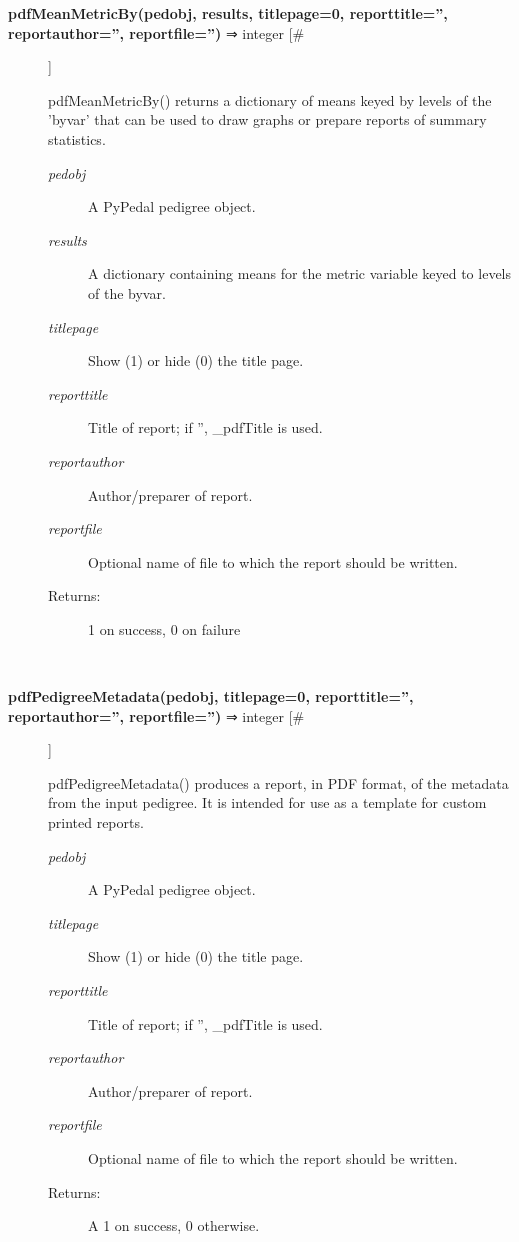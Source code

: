 \documentclass{article}
\begin{document}
\begin{description}
\item[\textbf{pdfMeanMetricBy(pedobj, results, titlepage=0, reporttitle='', reportauthor='', reportfile='')} ⇒ integer [\#]
]
\par pdfMeanMetricBy() returns a dictionary of means keyed by levels of the 'byvar' that
can be used to draw graphs or prepare reports of summary statistics.
\begin{description}
\item[\textit{pedobj}
]
A PyPedal pedigree object.
\item[\textit{results}
]
A dictionary containing means for the metric variable keyed to levels of the byvar.
\item[\textit{titlepage}
]
Show (1) or hide (0) the title page.
\item[\textit{reporttitle}
]
Title of report; if '', \_pdfTitle is used.
\item[\textit{reportauthor}
]
Author/preparer of report.
\item[\textit{reportfile}
]
Optional name of file to which the report should be written.
\item[Returns:
]
1 on success, 0 on failure
\end{description}\\

\item[\textbf{pdfPedigreeMetadata(pedobj, titlepage=0, reporttitle='', reportauthor='', reportfile='')} ⇒ integer [\#]
]
\par pdfPedigreeMetadata() produces a report, in PDF format, of the metadata from
the input pedigree.  It is intended for use as a template for custom printed
reports.
\begin{description}
\item[\textit{pedobj}
]
A PyPedal pedigree object.
\item[\textit{titlepage}
]
Show (1) or hide (0) the title page.
\item[\textit{reporttitle}
]
Title of report; if '', \_pdfTitle is used.
\item[\textit{reportauthor}
]
Author/preparer of report.
\item[\textit{reportfile}
]
Optional name of file to which the report should be written.
\item[Returns:
]
A 1 on success, 0 otherwise.
\end{description}\\

\end{description}
\end{document}
